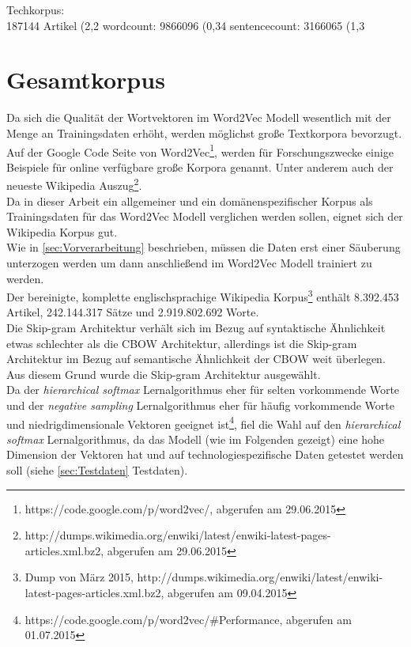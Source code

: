 \documentclass[12pt,a4paper]{report}
\begin{document}
	
	Techkorpus:\\
	187144 Artikel (2,2%
	wordcount: 9866096 (0,34%
	sentencecount: 3166065 (1,3%
\fi
	\section{Gesamtkorpus}
	\label{sec:Gesamtkorpus}
	Da sich die Qualität  der Wortvektoren im Word2Vec Modell wesentlich mit der Menge an Trainingsdaten erhöht\citep{DBLP:journals/corr/abs-1301-3781}, werden möglichst große Textkorpora bevorzugt. Auf der Google Code Seite von Word2Vec\footnote{https://code.google.com/p/word2vec/, abgerufen am 29.06.2015}, werden für Forschungszwecke einige Beispiele für online verfügbare große Korpora genannt. Unter anderem auch der neueste Wikipedia Auszug\footnote{http://dumps.wikimedia.org/enwiki/latest/enwiki-latest-pages-articles.xml.bz2, abgerufen am 29.06.2015}.\\
	Da in dieser Arbeit ein allgemeiner und ein domänenspezifischer Korpus als Trainingsdaten für das Word2Vec Modell verglichen werden sollen, eignet sich der Wikipedia Korpus gut. \\
	Wie in \ref{sec:Vorverarbeitung} beschrieben, müssen die Daten erst einer Säuberung unterzogen werden um dann anschließend im Word2Vec Modell trainiert zu werden.\\
	 Der bereinigte, komplette englischsprachige Wikipedia Korpus\footnote{Dump von März 2015, http://dumps.wikimedia.org/enwiki/latest/enwiki-latest-pages-articles.xml.bz2, abgerufen am 09.04.2015} enthält 8.392.453 Artikel, 242.144.317 Sätze und 2.919.802.692 Worte.\\


Die Skip-gram Architektur verhält sich im Bezug auf syntaktische Ähnlichkeit etwas schlechter als die CBOW Architektur, allerdings ist die Skip-gram Architektur im Bezug auf semantische Ähnlichkeit der CBOW weit überlegen\citep{DBLP:journals/corr/abs-1301-3781}.\\ Aus diesem Grund wurde die Skip-gram Architektur ausgewählt.\\
Da der \textit{hierarchical softmax} Lernalgorithmus eher für selten vorkommende Worte und der \textit{negative sampling} Lernalgorithmus eher für häufig vorkommende Worte und niedrigdimensionale Vektoren geeignet ist\footnote{https://code.google.com/p/word2vec/\#Performance, abgerufen am 01.07.2015}, fiel die Wahl auf den \textit{hierarchical softmax} Lernalgorithmus, da das Modell (wie im Folgenden gezeigt) eine hohe Dimension der Vektoren hat und auf technologiespezifische Daten getestet werden soll (siehe \ref{sec:Testdaten} Testdaten).\\
\end{document}
